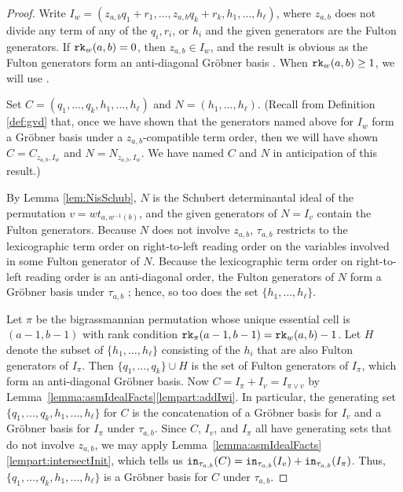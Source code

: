 \documentclass[12pt,reqno]{amsart}
\newtheorem{Main Conjecture}[theorem]{Main Conjecture}
\theoremstyle{remark}
\theoremstyle{plain}
\newcommand{\init}{{\tt in}}
\newcommand{\rk}{{\tt rk}}
\begin{document}
\begin{proof}
Write $I_w = (z_{a,b}q_1+r_1, \ldots, z_{a,b}q_k+r_k, h_1, \ldots, h_\ell)$, where $z_{a,b}$ does not divide any term of any of the $q_i, r_i$, or $h_i$ and the given generators are the Fulton generators.  If $\rk_w(a,b) = 0$, then $z_{a,b} \in I_w$, and the result is obvious 
 as the Fulton generators form an anti-diagonal Gr\"obner basis \cite[Theorem~B]{KM05}.  
 When
$\rk_w(a,b)\geq 1$, we will use \cite[Corollary 4.13]{KR}. 

Set $C = (q_1, \ldots, q_k, h_1, \ldots, h_\ell)$ and $N = (h_1, \ldots, h_\ell)$.  (Recall from Definition \ref{def:gvd} that, once we have shown that the generators named above for $I_w$ form a Gr\"obner basis under a $z_{a,b}$-compatible term order, then we will have shown $C = C_{z_{a,b},I_w}$ and $N = N_{z_{a,b},I_w}$.  We have named $C$ and $N$ in anticipation of this result.)

By Lemma \ref{lem:NisSchub}, $N$ is the Schubert determinantal ideal of the permutation $v = wt_{a, w^{-1}(b)}$, and the given generators of $N = I_v$ contain the Fulton generators. Because $N$ does not involve $z_{a,b}$, $\tau_{a,b}$ restricts to the lexicographic term order on right-to-left reading order on the variables involved in some Fulton generator of $N$.  Because the lexicographic term order on right-to-left reading order is an anti-diagonal order, the Fulton generators of $N$
 form a Gr\"obner basis
under $\tau_{a,b}$ \cite[Theorem~B]{KM05}; hence, so too does the set $\{h_1, \ldots, h_\ell\}$.  

Let $\pi$ be the bigrassmannian permutation whose unique essential cell is $(a-1,b-1)$ with rank condition $\rk_\pi(a-1,b-1) = \rk_w(a,b)-1$. Let $H$ denote the subset of $\{h_1, \ldots, h_\ell\}$ consisting of the $h_i$ that are also Fulton generators of $I_\pi$.  Then $\{q_1, \ldots, q_k\} \cup H$ is the set of Fulton generators of $I_\pi$, which form an anti-diagonal Gr\"obner basis.  Now $C = I_\pi + I_v=I_{\pi \vee v}$ by Lemma~\ref{lemma:asmIdealFacts}\ref{lempart:addIwi}.   In particular, the generating set
$\{q_1, \ldots, q_k, h_1, \ldots, h_\ell\}$ for $C$ is the concatenation of a Gr\"obner basis for $I_v$ and a Gr\"obner basis for $I_\pi$ under $\tau_{a,b}$.   Since $C$, $I_v$, and $I_\pi$ all have generating sets that do not involve $z_{a,b}$, we may apply Lemma~\ref{lemma:asmIdealFacts}\ref{lempart:intersectInit}, which tells us $\init_{\tau_{a,b}}(C)=\init_{\tau_{a,b}}(I_v)+\init_{\tau_{a,b}}(I_\pi)$.  Thus, $\{q_1, \ldots, q_k, h_1, \ldots, h_\ell\}$ is a Gr\"obner basis for $C$ under $\tau_{a,b}$.


\end{proof}
\end{document}

